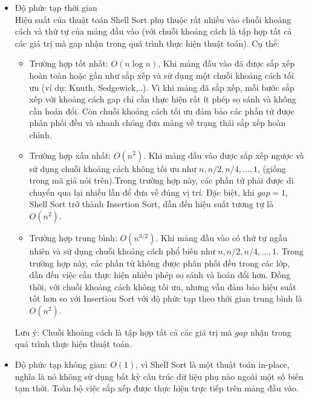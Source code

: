 \begin{itemize}
    \item Độ phức tạp thời gian \cite[p.~83--91]{knuth1998}\\
    Hiệu suất của thuật toán Shell Sort phụ thuộc rất nhiều vào chuỗi 
    khoảng cách và thứ tự của mảng đầu vào (với chuỗi khoảng cách là tập 
    hợp tất cả các giá trị mà gap nhận trong quá trình thực hiện thuật 
    toán). Cụ thể:
    \begin{itemize}[label=$\circ$]
	\item Trường hợp tốt nhất: $O\left(n\log{n}\right)$, Khi mảng đầu vào 
    đã được sắp xếp hoàn toàn hoặc gần như sắp xếp và sử dụng một chuỗi 
    khoảng cách tối ưu (ví dụ: Knuth, Sedgewick,..). Vì khi mảng đã sắp 
    xếp, mỗi bước sắp xếp với khoảng cách gap chỉ cần thực hiện rất ít 
    phép so sánh và không cần hoán đổi. Còn chuỗi khoảng cách tối ưu đảm 
    bảo các phần tử được phân phối đều và nhanh chóng đưa mảng về trạng 
    thái sắp xếp hoàn chỉnh.
	\item Trường hợp xấu nhất: $O\left(n^2\right)$. Khi mảng đầu vào được 
    sắp xếp ngược và sử dụng chuỗi khoảng cách không tối ưu như $n,n/2,n/4,
    \ldots,1$, (giống trong mã giả nói trên).Trong trường hợp này, các 
    phần tử phải được di chuyển qua lại nhiều lần để đưa về đúng vị trí. 
    Đặc biệt, khi $gap = 1$, Shell Sort trở thành Insertion Sort, dẫn đến 
    hiệu suất tương tự là $O\left(n^2\right)$.
    \item Trường hợp trung bình: $O\left(n^{3/2}\right)$. Khi mảng đầu vào 
    có thứ tự ngẫu nhiên và sử dụng chuỗi khoảng cách phổ biến như $n,n/2,
    n/4,\ldots,1$. Trong trường hợp này, các phần tử không được phân phối 
    đều trong các lớp, dẫn đến việc cần thực hiện nhiều phép so sánh và 
    hoán đổi hơn. Đồng thời, với chuỗi khoảng cách không tối ưu, nhưng vẫn 
    đảm bảo hiệu suất tốt hơn so với Insertion Sort với độ phức tạp theo 
    thời gian trung bình là $O\left(n^2\right)$.
    \end{itemize}
    Lưu ý: Chuỗi khoảng cách là tập hợp tất cả các giá trị mà $gap$ nhận 
    trong quá trình thực hiện thuật toán.
    
    \item Độ phức tạp không gian: $O\left(1\right)$, vì Shell Sort là một 
    thuật toán in-place, nghĩa là nó không sử dụng bất kỳ cấu trúc dữ liệu 
    phụ nào ngoài một số biến tạm thời. Toàn bộ việc sắp xếp được thực hiện 
    trực tiếp trên mảng đầu vào. 
\end{itemize}